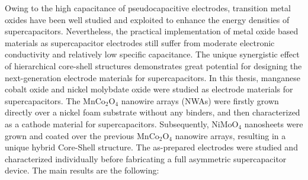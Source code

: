 \documentclass[reprint,amsmath,amssymb,aps,floatfix,
]{revtex4-2}
\begin{document}
Owing to the high capacitance of pseudocapacitive electrodes, transition metal oxides have been well studied and exploited to enhance the energy densities of supercapacitors.  Nevertheless, the practical implementation of metal oxide based materials as supercapacitor electrodes still suffer from moderate electronic conductivity and relatively low specific capacitance. The unique synergistic effect of hierarchical core-shell structures demonstrates great  potential for designing the next-generation electrode materials for supercapacitors. In this thesis, manganese cobalt oxide and nickel molybdate oxide were studied as electrode materials for supercapacitors. The MnCo$_2$O$_4$ nanowire arrays (NWAs) were firstly grown directly over a nickel foam substrate without any binders, and then characterized as a cathode material for supercapacitors. Subsequently, NiMoO$_4$ nanosheets were grown and coated over the previous MnCo$_2$O$_4$ nanowire arrays, resulting in a unique hybrid Core-Shell structure. The as-prepared electrodes were studied and characterized individually before fabricating a full asymmetric supercapacitor device. The main results are the following:
\end{document}
